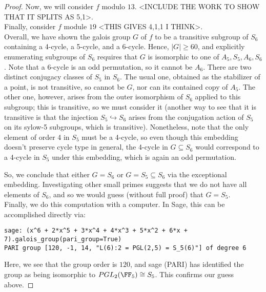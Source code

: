 \begin{proof}
	Now, we will consider $f$ modulo $13$. <INCLUDE THE WORK TO SHOW THAT IT SPLITS AS 5,1>. \\
	
	Finally, consider $f$ module $19$ <THIS GIVES 4,1,1 I THINK>. \\
	
	Overall, we have shown the galois group $G$ of $f$ to be a transitive subgroup of $S_6$ containing a 4-cycle, a 5-cycle, and a 6-cycle. Hence, $|G| \geq 60$, and explicitly enumerating subgroups of $S_6$ requires that $G$ is isomorphic to one of $A_5,S_5,A_6,S_6$. Note that a 6-cycle is an odd permutation, so it cannot be $A_6$. There are two distinct conjugacy classes of $S_5$ in $S_6$. The usual one, obtained as the stabilizer of a point, is not transitive, so cannot be $G$, nor can its contained copy of $A_5$. The other one, however, arises from the outer isomorphism of $S_6$ applied to this subgroup; this is transitive, so we must consider it (another way to see that it is transitive is that the injection $S_5 \hookrightarrow S_6$ arises from the conjugation action of $S_5$ on its sylow-5 subgroups, which is transitive). Nonetheless, note that the only element of order 4 in $S_5$ must be a 4-cycle, so even though this embedding doesn't preserve cycle type in general, the 4-cycle in $G \subseteq S_6$ would correspond to a 4-cycle in $S_5$ under this embedding, which is again an odd permutation.
	
	So, we conclude that either $G = S_6$ or $G = S_5 \subseteq S_6$ via the exceptional embedding. Investigating other small primes suggests that we do not have all elements of $S_6$, and so we would guess (without full proof) that $G = S_5$. \\
	
	Finally, we do this computation with a computer. In Sage, this can be accomplished directly via:
	\begin{verbatim}
sage: (x^6 + 2*x^5 + 3*x^4 + 4*x^3 + 5*x^2 + 6*x + 7).galois_group(pari_group=True)
PARI group [120, -1, 14, "L(6):2 = PGL(2,5) = S_5(6)"] of degree 6
	\end{verbatim}
	Here, we see that the group order is $120$, and sage (PARI) has identified the group as being isomorphic to $PGL_2(\FF_5) \cong S_5$. This confirms our guess above.
	

\end{proof}
